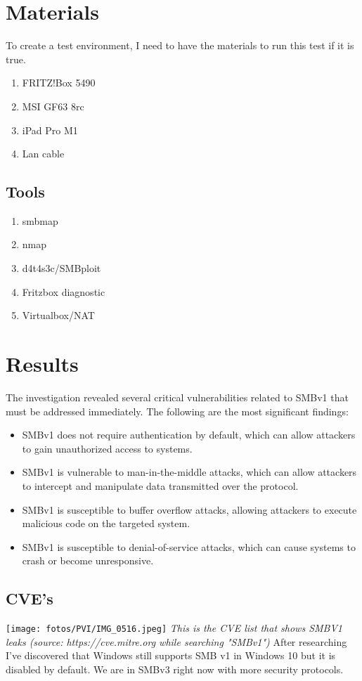 \documentclass[12pt, letterpaper]{article}
\begin{document}
\section{Materials}
To create a test environment, I need to have the materials to run this test if it is true.
\begin{enumerate}[label=(\roman*)]
    \item FRITZ!Box 5490
    \item MSI GF63 8rc
    \item iPad Pro M1
    \item Lan cable
\end{enumerate}
\subsection{Tools}
\begin{enumerate}
    \item smbmap
    \item nmap
    \item d4t4s3c/SMBploit
    \item Fritzbox diagnostic
    \item Virtualbox/NAT
\end{enumerate}
\section{Results}

The investigation revealed several critical vulnerabilities related to SMBv1 that must be addressed immediately. The following are the most significant findings:

\begin{itemize}
\item SMBv1 does not require authentication by default, which can allow attackers to gain unauthorized access to systems.
\item SMBv1 is vulnerable to man-in-the-middle attacks, which can allow attackers to intercept and manipulate data transmitted over the protocol.
\item SMBv1 is susceptible to buffer overflow attacks, allowing attackers to execute malicious code on the targeted system.
\item SMBv1 is susceptible to denial-of-service attacks, which can cause systems to crash or become unresponsive.
\end{itemize}

\subsection{CVE's}
\texttt{[image: fotos/PVI/IMG\_0516.jpeg]}
\break
\emph{This is the CVE list that shows SMBV1 leaks (source: https://cve.mitre.org while searching "SMBv1")}
\hfill\break
\hfill\break
After researching I've discovered that Windows still supports SMB v1 in Windows 10 but it is disabled by default. We are in SMBv3 right now with more security protocols.
\end{document}
